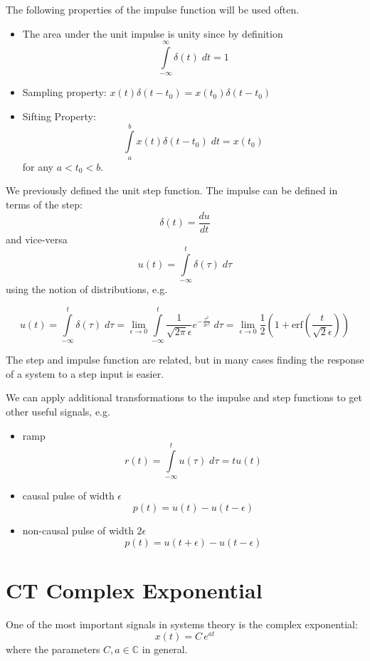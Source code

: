 The following properties of the impulse function will be used often.

\begin{itemize}
\item The area under the unit impulse is unity since by definition
  \[
  \int\limits_{-\infty}^{\infty} \delta(t) \; dt = 1
  \]
\item Sampling property: $x(t)\delta(t-t_0) = x(t_0)\delta(t-t_0)$
\item Sifting Property:
  \[
  \int\limits_{a}^{b} x(t)\delta(t-t_0) \; dt = x(t_0)
  \]
  for any $a < t_0 < b$.
\end{itemize}

We previously defined the unit step function. The impulse can be defined in terms of the step:
\[
\delta(t) = \frac{du}{dt}
\]
and vice-versa
\[
u(t) = \int\limits_{-\infty}^{t} \delta(\tau) \; d\tau
\]
using the notion of distributions, e.g.

\[
u(t) = \int\limits_{-\infty}^{t} \delta(\tau) \; d\tau = \lim_{\epsilon \rightarrow 0} \int\limits_{-\infty}^{t} \frac{1}{\sqrt{2\pi}\epsilon} e^{-\frac{\tau^2}{2\epsilon^2}} \; d\tau = \lim_{\epsilon \rightarrow 0} \frac{1}{2}\left(1+\text{erf}\left( \frac{t}{\sqrt{2}\epsilon}\right)\right)
\]

The step and impulse function are related, but in many cases finding the response of a system to a step input is easier.

We can apply additional transformations to the impulse and step functions to get other useful signals, e.g.

\begin{itemize}
\item ramp
  \[
  r(t) = \int\limits_{-\infty}^{t} u(\tau) \; d\tau = tu(t)
  \]
  
\item causal pulse of width $\epsilon$
  \[
  p(t) = u(t) - u(t-\epsilon)
  \]
  
\item non-causal pulse of width $2\epsilon$
  \[
      p(t) = u(t+\epsilon) - u(t-\epsilon)
      \]
\end{itemize}

\section{CT Complex Exponential}

One of the most important signals in systems theory is the complex exponential:
\[
x(t) = C\, e^{a t}
\]
where the parameters $C, a \in \mathbb{C}$ in general.

